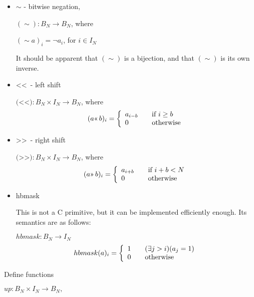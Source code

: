 \documentclass{article}
\begin{document}
\begin{itemize}
\item $\sim$ - bitwise negation, 

$ (\sim) : B_N \rightarrow B_N$, where

$( \sim a)_i = \neg a_i$, for $i \in I_N$

It should be apparent that $(\sim)$ is a bijection, and that $(\sim)$ is its 
own inverse.
\item \textless\textless \,  - left shift

$ ($\textless\textless$) : B_N \times I_N  \rightarrow B_N$, where
\begin{equation*} 
(a \text{\textless\textless} \, b)_i = \left\{
    \begin{array}{l l}
    a_{i-b} & \quad \text{if $i \ge b$}\\
    0 & \quad \text{otherwise}
    \end{array}\right.
\end{equation*}
\item \textgreater\textgreater \,  - right shift

$ ($\textgreater\textgreater$) : B_N \times I_N  \rightarrow B_N$, where
\begin{equation*} 
(a \text{\textgreater\textgreater} \, b)_i = \left\{
    \begin{array}{l l}
    a_{i+b} & \quad \text{if $i+b < N$}\\
    0 & \quad \text{otherwise}
    \end{array}\right.
\end{equation*}
\item hbmask

This is not a C primitive, but it can be implemented efficiently enough.
Its semantics are as follows:

$hbmask : B_N \rightarrow I_N$
\begin{equation*} 
hbmask(a)_i = \left\{
    \begin{array}{l l}
    1 & \quad (\exists j > i)(a_j = 1)\\
    0 & \quad \text{otherwise}
    \end{array}\right.
\end{equation*}

\end{itemize}
\vspace{10pt}

Define functions
\vspace{10pt}

$up : B_N \times I_N \rightarrow B_N,$
\end{document}
